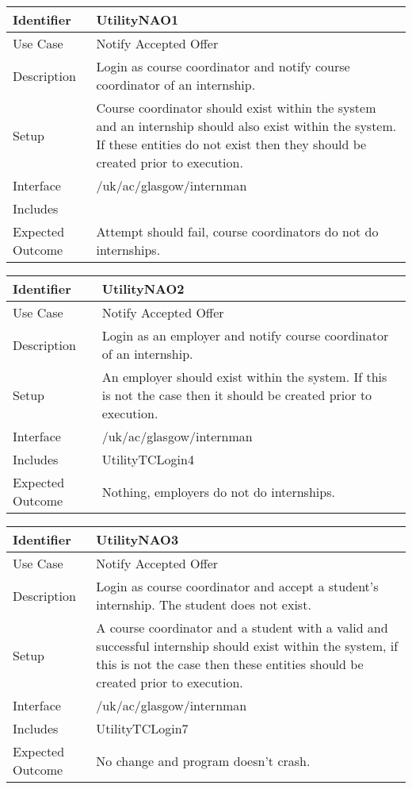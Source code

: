 \begin{tabularx}{\textwidth}{|T|L|}
\hline
Identifier & UtilityNAO1\\
\hline
Use Case & Notify Accepted Offer \\
\hline
Description & Login as course coordinator and notify course
coordinator of an internship.\\
\hline
Setup & Course coordinator should exist within the system and an
internship should also exist within the system. If these entities do
not exist then they should be created prior to execution.\\
\hline
Interface & /uk/ac/glasgow/internman \\
\hline
Includes & \\
\hline
Expected Outcome & Attempt should fail, course coordinators do not do
internships.\\
\hline
\end{tabularx}

\vspace{2em}

\begin{tabularx}{\textwidth}{|T|L|}
\hline
Identifier & UtilityNAO2\\
\hline
Use Case & Notify Accepted Offer \\
\hline
Description & Login as an employer and notify course coordinator of an 
internship.\\
\hline
Setup & An employer should exist within the system. If this is not the
case then it should be created prior to execution. \\
\hline
Interface & /uk/ac/glasgow/internman \\
\hline
Includes & UtilityTCLogin4 \\
\hline
Expected Outcome & Nothing, employers do not do internships.\\
\hline
\end{tabularx}

\vspace{2em}

\begin{tabularx}{\textwidth}{|T|L|}
\hline
Identifier & UtilityNAO3\\
\hline
Use Case & Notify Accepted Offer \\
\hline
Description & Login as course coordinator and accept a student's internship.
The student does not exist.\\
\hline
Setup & A course coordinator and a student with a valid and successful
internship should exist within the system, if this is not the case
then these entities should be created prior to execution.\\
\hline
Interface & /uk/ac/glasgow/internman \\
\hline
Includes & UtilityTCLogin7 \\
\hline
Expected Outcome & No change and program doesn't crash.\\
\hline
\end{tabularx}

